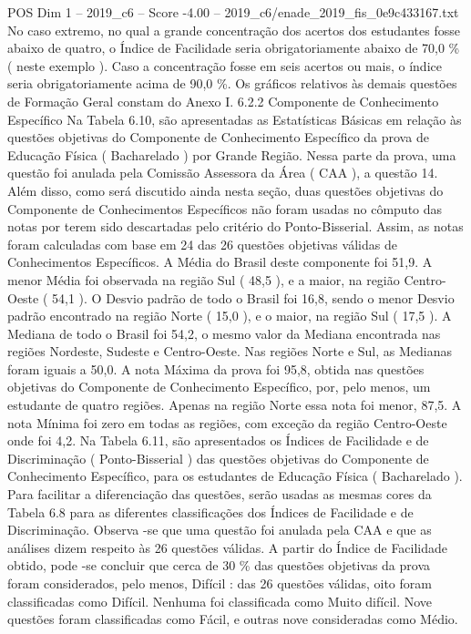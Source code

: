 \begin{textsample}{POS Dim 1 – 2019\_c6 – Score -4.00 – 2019\_c6/enade\_2019\_fis\_0e9c433167.txt}
No caso extremo, no qual a grande concentração dos acertos dos estudantes fosse abaixo de quatro, o Índice de Facilidade seria obrigatoriamente abaixo de 70,0 \% ( neste exemplo ).
Caso a concentração fosse em seis acertos ou mais, o índice seria obrigatoriamente acima de 90,0 \%.
Os gráficos relativos às demais questões de Formação Geral constam do Anexo I. 6.2.2 Componente de Conhecimento Específico Na Tabela 6.10, são apresentadas as Estatísticas Básicas em relação às questões objetivas do Componente de Conhecimento Específico da prova de Educação Física ( Bacharelado ) por Grande Região.
Nessa parte da prova, uma questão foi anulada pela Comissão Assessora da Área ( CAA ), a questão 14.
Além disso, como será discutido ainda nesta seção, duas questões objetivas do Componente de Conhecimentos Específicos não foram usadas no cômputo das notas por terem sido descartadas pelo critério do Ponto-Bisserial.
Assim, as notas foram calculadas com base em 24 das 26 questões objetivas válidas de Conhecimentos Específicos.
A Média do Brasil deste componente foi 51,9.
A menor Média foi observada na região Sul ( 48,5 ), e a maior, na região Centro-Oeste ( 54,1 ).
O Desvio padrão de todo o Brasil foi 16,8, sendo o menor Desvio padrão encontrado na região Norte ( 15,0 ), e o maior, na região Sul ( 17,5 ).
A Mediana de todo o Brasil foi 54,2, o mesmo valor da Mediana encontrada nas regiões Nordeste, Sudeste e Centro-Oeste.
Nas regiões Norte e Sul, as Medianas foram iguais a 50,0.
A nota Máxima da prova foi 95,8, obtida nas questões objetivas do Componente de Conhecimento Específico, por, pelo menos, um estudante de quatro regiões.
Apenas na região Norte essa nota foi menor, 87,5.
A nota Mínima foi zero em todas as regiões, com exceção da região Centro-Oeste onde foi 4,2.
Na Tabela 6.11, são apresentados os Índices de Facilidade e de Discriminação ( Ponto-Bisserial ) das questões objetivas do Componente de Conhecimento Específico, para os estudantes de Educação Física ( Bacharelado ).
Para facilitar a diferenciação das questões, serão usadas as mesmas cores da Tabela 6.8 para as diferentes classificações dos Índices de Facilidade e de Discriminação.
Observa -se que uma questão foi anulada pela CAA e que as análises dizem respeito às 26 questões válidas.
A partir do Índice de Facilidade obtido, pode -se concluir que cerca de 30 \% das questões objetivas da prova foram considerados, pelo menos, Difícil : das 26 questões válidas, oito foram classificadas como Difícil.
Nenhuma foi classificada como Muito difícil.
Nove questões foram classificadas como Fácil, e outras nove consideradas como Médio.

\end{textsample}
